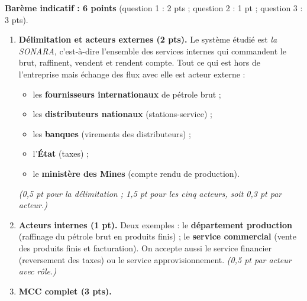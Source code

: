 \documentclass[11pt]{article}
\begin{document}
\begin{corrige}
\textbf{Barème indicatif : 6 points} (question 1 : 2 pts ; question 2 : 1 pt ; question 3 : 3 pts).
\begin{enumerate}
\item \textbf{Délimitation et acteurs externes (2 pts).} Le système étudié est \emph{la SONARA}, c'est-à-dire l'ensemble des services internes qui commandent le brut, raffinent, vendent et rendent compte. Tout ce qui est hors de l'entreprise mais échange des flux avec elle est acteur externe :
\begin{itemize}
\item les \textbf{fournisseurs internationaux} de pétrole brut ;
\item les \textbf{distributeurs nationaux} (stations-service) ;
\item les \textbf{banques} (virements des distributeurs) ;
\item l'\textbf{État} (taxes) ;
\item le \textbf{ministère des Mines} (compte rendu de production).
\end{itemize}
\emph{(0,5 pt pour la délimitation ; 1,5 pt pour les cinq acteurs, soit 0,3 pt par acteur.)}
\item \textbf{Acteurs internes (1 pt).} Deux exemples : le \textbf{département production} (raffinage du pétrole brut en produits finis) ; le \textbf{service commercial} (vente des produits finis et facturation). On accepte aussi le service financier (reversement des taxes) ou le service approvisionnement. \emph{(0,5 pt par acteur avec rôle.)}
\item \textbf{MCC complet (3 pts).}
\end{enumerate}
\begin{popfigure}
\begin{center}
\end{center}
\end{popfigure}
\end{corrige}
\end{document}
